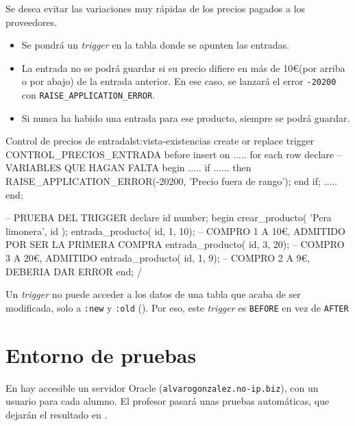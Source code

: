 \begin{homeworkProblem}

  Se desea evitar las variaciones muy rápidas de los precios pagados a los proveedores.
  \begin{itemize}
  \item Se pondrá un \textit{trigger} en la tabla donde se apunten las entradas.
  \item La entrada  no se podrá guardar si su precio difiere en más de 10\euro (por arriba o por abajo) de la entrada anterior. En ese caso, se lanzará el error \texttt{-20200} con \texttt{RAISE\_APPLICATION\_ERROR}.
  \item Si nunca ha habido una entrada para ese producto, siempre se podrá guardar.
  \end{itemize}

\begin{listadosql}{Control de precios de entrada}{lst:vista-existencias}
create or replace trigger CONTROL_PRECIOS_ENTRADA
before insert on .....
for each row 
declare
-- VARIABLES QUE HAGAN FALTA
begin
.....
if ...... then
RAISE_APPLICATION_ERROR(-20200, 'Precio fuera de rango');
end if;
.....
end;

-- PRUEBA DEL TRIGGER
declare
id number;
begin
crear_producto( 'Pera limonera', id );
entrada_producto( id, 1, 10); -- COMPRO 1 A 10€, ADMITIDO POR SER LA PRIMERA COMPRA
entrada_producto( id, 3, 20); -- COMPRO 3 A 20€, ADMITIDO
entrada_producto( id, 1, 9); -- COMPRO 2 A 9€, DEBERIA DAR ERROR
end;
/
\end{listadosql}  

  \begin{Aviso}
    Un \textit{trigger} no puede acceder a los datos de una tabla que acaba de ser modificada, solo a \texttt{:new} y \texttt{:old} (). Por eso, este \textit{trigger} es \texttt{BEFORE} en vez de \texttt{AFTER}
  \end{Aviso}


\end{homeworkProblem}


\section{Entorno de pruebas}
En hay accesible un servidor Oracle (\texttt{alvarogonzalez.no-ip.biz}), con un usuario para cada alumno.
El profesor pasará unas pruebas automáticas, que dejarán el resultado en .

